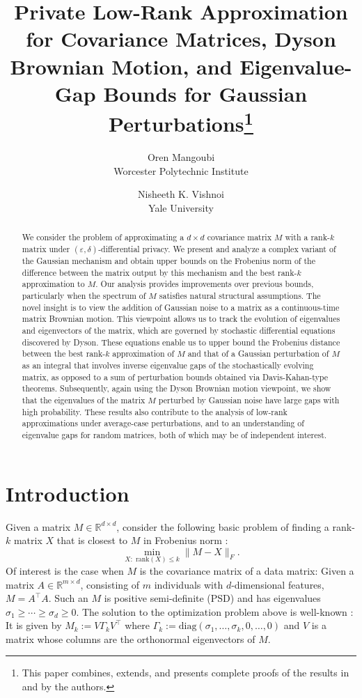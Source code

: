 \documentclass[11pt,letterpaper]{article}
\title{\bf Private Low-Rank Approximation for Covariance Matrices, Dyson Brownian Motion, and Eigenvalue-Gap Bounds for Gaussian Perturbations\footnote{This paper combines, extends, and presents complete proofs of the results in \cite{DBM_Neurips} and \cite{our-COLT} by the authors.}
}
\author{Oren Mangoubi\\ Worcester Polytechnic Institute \and Nisheeth K. Vishnoi \\ Yale University}
\newcommand{\eps}{\varepsilon}
\begin{document}
\date{}

\allowdisplaybreaks

\maketitle

\begin{abstract}

We consider the problem of approximating a $d \times d$ covariance matrix $M$ with a rank-$k$ matrix under $(\eps,\delta)$-differential privacy. 
%
We present and analyze a complex variant of the Gaussian mechanism and obtain upper bounds on the Frobenius norm of the difference between the matrix output by this mechanism and the best rank-$k$ approximation to $M$.
 Our analysis provides improvements over previous bounds, particularly when the spectrum of 
$M$ satisfies natural structural assumptions. 
%
The novel insight is to view the addition of Gaussian noise to a matrix as a continuous-time matrix Brownian motion. 
%
This viewpoint allows us to track the evolution of eigenvalues and eigenvectors of the matrix, which are governed by stochastic differential equations discovered by Dyson. 
%
These equations enable us to upper bound the Frobenius distance between the best rank-$k$ approximation of $M$ and that of a Gaussian perturbation of $M$ as an integral that involves inverse eigenvalue gaps of the stochastically evolving matrix, as opposed to a sum of perturbation bounds obtained via Davis-Kahan-type theorems.
%
Subsequently, again using the Dyson Brownian motion viewpoint, we show that the eigenvalues of the matrix $M$ perturbed by  Gaussian noise have large gaps with high probability.
% 
These results also contribute to the analysis of low-rank approximations under average-case perturbations, and to an understanding of eigenvalue gaps for random matrices, both of which may be of independent interest.

\end{abstract}

\newpage
\tableofcontents
\newpage

\section{Introduction}

Given a  matrix $M \in \mathbb{R}^{d \times d}$,  consider the following basic problem of finding a rank-$k$ matrix $X$ that is closest to $M$ in Frobenius norm   \cite{bhatia2013matrix,blum2020foundations}:
%
$$ \min_{X: \mbox{ rank} (X)\leq k} \|M-X\|_F.$$
%
Of interest is the case when $M$ is the covariance matrix of a data matrix: Given a 
 matrix $A \in \mathbb{R}^{m \times d}$, consisting of $m$ individuals with $d$-dimensional features, $M=A^\top A$.
%
Such an $M$ is positive semi-definite (PSD) and has eigenvalues $\sigma_1 \geq \cdots \geq \sigma_d \geq 0$.
%
The  solution to the  optimization problem above is well-known \cite{bhatia2013matrix}: It is given by 
$M_k:= V \Gamma_k V^\top$  where $\Gamma_k := \mathrm{diag}(\sigma_1,\ldots, \sigma_k, 0,\ldots, 0)$
and $V$ is a matrix whose columns are the orthonormal 
eigenvectors of $M$.
\end{document}
